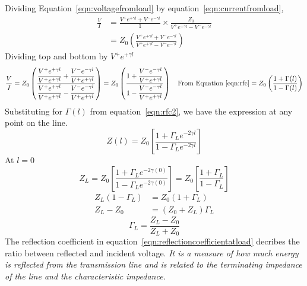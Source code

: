 Dividing Equation~\eqref{eqn:voltagefromload} by equation~\eqref{eqn:currentfromload},
\begin{align*}
\frac{V}{I} &= \frac{V^+e^{+\gamma l}+V^-e^{-\gamma l}}{1}\times \frac{Z_0}{V^+e^{+\gamma l}-V^-e^{-\gamma l}}\\
&= Z_0\left( \frac{V^+e^{+\gamma l}+V^-e^{-\gamma l}}{V^+e^{+\gamma l}-V^-e^{-\gamma l}}\right) 
\end{align*}
Dividing top and bottom by $V^+e^{+\gamma l}$
\begin{dmath*}
\frac{V}{I} = Z_0\left( \frac{\dfrac{V^+e^{+\gamma l}}{V^+e^{+\gamma l}}+\dfrac{V^-e^{-\gamma l}}{V^+e^{+\gamma l}}}{\dfrac{V^+e^{+\gamma l}}{V^+e^{+\gamma l}}-\dfrac{V^-e^{-\gamma l}}{V^+e^{+\gamma l}}}\right)
= Z_0\left( \frac{1 + \dfrac{V^-e^{-\gamma l}}{V^+e^{+\gamma l}}}{1 - \dfrac{V^-e^{-\gamma l}}{V^+e^{+\gamma l}}}\right)\quad\text{From Equation~\ref{eqn:rfc}}
=Z_0\left( \frac{1+\Gamma (l)}{1 -\Gamma (l)}\right)
\end{dmath*}
Substituting for $\Gamma (l)$ from equation~\eqref{eqn:rfc2}, we have the expression at any point on the line.
\begin{equation}
Z(l) = Z_0\left[ \frac{1 + \Gamma_L e^{-2\gamma l}}{1 - \Gamma_L e^{-2\gamma l}}\right] 
\end{equation}
At $l = 0$ 
\begin{dmath}
Z_L = Z_0\left[ \frac{1 + \Gamma_L e^{-2\gamma (0)}}{1 - \Gamma_L e^{-2\gamma (0)}}\right] 
= Z_0\left[\frac{1 + \Gamma_L}{1 - \Gamma_L}\right] 
\end{dmath}
\begin{align*}
Z_L(1 - \Gamma_L) &= Z_0(1 + \Gamma_L)\\
Z_L - Z_0 &= (Z_0 + Z_L)\Gamma_L
\end{align*}
\begin{equation}
\Gamma_L = \frac{Z_L - Z_0}{Z_L + Z_0}
\label{eqn:reflectioncoefficientatload}
\end{equation}
The reflection coefficient in equation~\eqref{eqn:reflectioncoefficientatload} decribes the ratio between reflected and incident voltage. \emph{It is a measure of how much energy is reflected from the transmission line and is related to the terminating impedance of the line and the characteristic impedance.}

